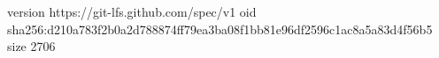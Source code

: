 version https://git-lfs.github.com/spec/v1
oid sha256:d210a783f2b0a2d788874ff79ea3ba08f1bb81e96df2596c1ac8a5a83d4f56b5
size 2706
